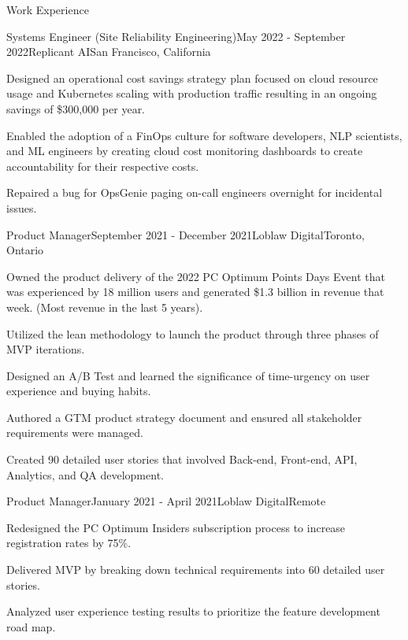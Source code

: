 \documentclass{resume} %
\begin{document}

\begin{rSection}{Work Experience}

\begin{rSubsection}{Systems Engineer (Site Reliability Engineering)}{May 2022 - September 2022}{Replicant AI}{San Francisco, California}
\item Designed an operational cost savings strategy plan focused on cloud resource usage and Kubernetes scaling with production traffic resulting in an ongoing savings of \$300,000 per year.
\item Enabled the adoption of a FinOps culture for software developers, NLP scientists, and ML engineers by creating cloud cost monitoring dashboards to create accountability for their respective costs.
\item Repaired a bug for OpsGenie paging on-call engineers overnight for incidental issues.
\end{rSubsection}

\begin{rSubsection}{Product Manager}{September 2021 - December 2021}{Loblaw Digital}{Toronto, Ontario}
\item Owned the product delivery of the 2022 PC Optimum Points Days Event that was experienced by 18 million users and generated \$1.3 billion in revenue that week. (Most revenue in the last 5 years).
\item Utilized the lean methodology to launch the product through three phases of MVP iterations. 
\item Designed an A/B Test and learned the significance of time-urgency on user experience and buying habits.
\item Authored a GTM product strategy document and ensured all stakeholder requirements were managed.
\item Created 90 detailed user stories that involved Back-end, Front-end, API, Analytics, and QA development.
\end{rSubsection}


\begin{rSubsection}{Product Manager}{January 2021 - April 2021}{Loblaw Digital}{Remote}
\item Redesigned the PC Optimum Insiders subscription process to increase registration rates by 75\%.
\item Delivered MVP by breaking down technical requirements into 60 detailed user stories.
\item Analyzed user experience testing results to prioritize the feature development road map.
\end{rSubsection}


\end{rSection}
\end{document}
